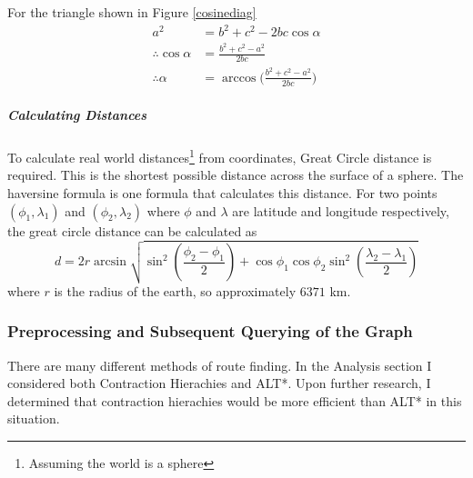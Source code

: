 \documentclass[11pt,twoside,a4paper]{article}
\begin{document}
For the triangle shown in Figure \ref{cosinediag}
\begin{align*}
a^2 &= b^2 + c^2 - 2bc\cos{\alpha}\\
\therefore \cos{\alpha} &= \frac{b^2+c^2-a^2}{2bc}\\
\therefore \alpha &= \arccos{(\frac{b^2+c^2-a^2}{2bc}})
\end{align*}
\subparagraph{Calculating Distances}
To calculate real world distances\footnote{Assuming the world is a sphere} from coordinates, Great Circle distance is required. This is the shortest possible distance across the surface of a sphere. The haversine formula\cite{de1795memoria} is one formula that calculates this distance.
For two points $(\phi_1,\lambda_1)$ and $(\phi_2,\lambda_2)$ where $\phi$ and $\lambda$ are latitude and longitude respectively, the great circle distance can be calculated as
\[
d = 2r\arcsin\sqrt{\sin^2{(\frac{\phi_2-\phi_1}{2})}+\cos{\phi_1}\cos{\phi_2}\sin^2{(\frac{\lambda_2-\lambda_1}{2})}}
\]
where $r$ is the radius of the earth, so approximately $6371$ km.
\subsubsection{Preprocessing and Subsequent Querying of the Graph}
There are many different methods of route finding\cite{travelplannervideo}. In the Analysis section I considered both Contraction Hierachies\cite{Geisberger2012} and ALT*. Upon further research, I determined that contraction hierachies would be more
efficient than ALT* in this situation. 
\end{document}
